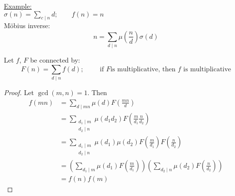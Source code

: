 \documentclass{report}
\begin{document}
\underline{Example:} \\
$\sigma(n) = \sum_{c \mid n} d ; \qquad f(n)=n$\\
M\"{o}bius inverse: \[ n= \sum_{d \mid n} \mu(\frac{n}{d}) \sigma(d)\]
\begin{thm}
				Let $f$, $F$ be connected by:
					\[F(n)=\sum_{d \mid n} f(d) ;\qquad \text{ if }F\text{is multiplicative, then }f\text{ is multiplicative}\]
\end{thm}
\begin{proof}
		Let $\gcd(m,n)=1$. Then 
\begin{equation*}
\begin{aligned}
f(mn)&=\sum_{d \mid mn} \mu(d) F(\frac{mn}{d})\\
&=\sum_{\substack{d_1 \mid m\\d_2 \mid n}} \mu(d_1 d_2) F(\frac{m}{d_1} \frac{n}{d_2})\\
&=\sum_{\substack{d_1 \mid m \\d_2 \mid n}} \mu(d_1) \mu(d_2) F(\frac{m}{d_1})F(\frac{n}{d_2})\\
&=\left(\sum_{d_1 \mid m} \mu(d_1) F(\frac{m}{d_1})\right) \left(\sum_{d_2 \mid n} \mu(d_2) F(\frac{n}{d_2})\right)\\
&=f(n)f(m)		
\end{aligned}
\end{equation*}
													
																										
													
\end{proof}
\end{document}
